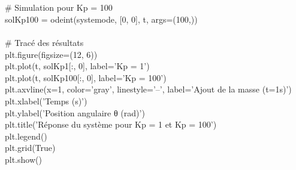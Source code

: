 \documentclass[letterpaper,12pt]{article}
\begin{document}
\\
\\# Simulation pour Kp = 100
\\solKp100 = odeint(systemode, [0, 0], t, args=(100,))
\\
\\# Tracé des résultats
\\plt.figure(figsize=(12, 6))
\\plt.plot(t, solKp1[:, 0], label='Kp = 1')
\\plt.plot(t, solKp100[:, 0], label='Kp = 100')
\\plt.axvline(x=1, color='gray', linestyle='--', label='Ajout de la masse (t=1s)')
\\plt.xlabel('Temps (s)')
\\plt.ylabel('Position angulaire θ (rad)')
\\plt.title('Réponse du système pour Kp = 1 et Kp = 100')
\\plt.legend()
\\plt.grid(True)
\\plt.show()
\end{document}
